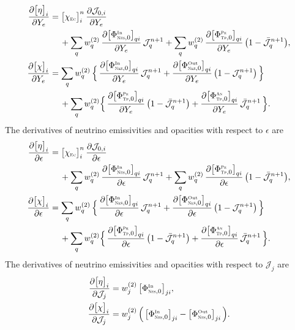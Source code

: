 \documentclass[12pt]{article}
\newcommand{\EC}{\mbox{\tiny{\sc Ec}}}
\newcommand{\NES}{\mbox{\tiny{\sc Nes}}} %
\newcommand{\PROD}{\mbox{\tiny{\sc Pr}}}
\newcommand{\ANN}{\mbox{\tiny{\sc An}}}
\newcommand{\TP}{\mbox{\tiny{\sc Tp}}}      %
\begin{document}
\begin{align}
  \pderiv{\big[\eta\big]_{i}}{Y_{e}}
  &=\big[\chi_{\EC}\big]_{i}^{n}\,\pderiv{\mathcal{J}_{0,i}}{Y_{e}} \nonumber \\
  &\hspace{12pt}
  +\sum_{q}w_{q}^{(2)}\,\pderiv{\big[\Phi_{\NES,0}^{\In}\big]_{qi}}{Y_{e}}\,\mathcal{J}_{q}^{n+1}
  +\sum_{q}w_{q}^{(2)}\,\pderiv{\big[\Phi_{\TP,0}^{\PROD}\big]_{qi}}{Y_{e}}\,\big(1-\bar{\mathcal{J}}_{q}^{n+1}\big) , \\
  \pderiv{\big[\chi\big]_{i}}{Y_{e}}
  &=\sum_{q}w_{q}^{(2)}\,\Big\{\,\pderiv{\big[\Phi_{\NES,0}^{\In}\big]_{qi}}{Y_{e}}\,\mathcal{J}_{q}^{n+1}+\pderiv{\big[\Phi_{\NES,0}^{\Out}\big]_{qi}}{Y_{e}}\,\big(1-\mathcal{J}_{q}^{n+1}\big)\,\Big\} \nonumber \\
  &\hspace{12pt}
  +\sum_{q}w_{q}^{(2)}\Big\{\,\pderiv{\big[\Phi_{\TP,0}^{\PROD}\big]_{qi}}{Y_{e}}\,\big(1-\bar{\mathcal{J}}_{q}^{n+1}\big)+\pderiv{\big[\Phi_{\TP,0}^{\ANN}\big]_{qi}}{Y_{e}}\,\bar{\mathcal{J}}_{q}^{n+1}\,\Big\}.  
\end{align}
The derivatives of neutrino emissivities and opacities with respect to $\epsilon$ are
\begin{align}
  \pderiv{\big[\eta\big]_{i}}{\epsilon}
  &=\big[\chi_{\EC}\big]_{i}^{n}\,\pderiv{\mathcal{J}_{0,i}}{\epsilon} \nonumber \\
  &\hspace{12pt}
  +\sum_{q}w_{q}^{(2)}\,\pderiv{\big[\Phi_{\NES,0}^{\In}\big]_{qi}}{\epsilon}\,\mathcal{J}_{q}^{n+1}
  +\sum_{q}w_{q}^{(2)}\,\pderiv{\big[\Phi_{\TP,0}^{\PROD}\big]_{qi}}{\epsilon}\,\big(1-\bar{\mathcal{J}}_{q}^{n+1}\big) , \\
  \pderiv{\big[\chi\big]_{i}}{\epsilon}
  &=\sum_{q}w_{q}^{(2)}\,\Big\{\,\pderiv{\big[\Phi_{\NES,0}^{\In}\big]_{qi}}{\epsilon}\,\mathcal{J}_{q}^{n+1}+\pderiv{\big[\Phi_{\NES,0}^{\Out}\big]_{qi}}{\epsilon}\,\big(1-\mathcal{J}_{q}^{n+1}\big)\,\Big\} \nonumber \\
  &\hspace{12pt}
  +\sum_{q}w_{q}^{(2)}\Big\{\,\pderiv{\big[\Phi_{\TP,0}^{\PROD}\big]_{qi}}{\epsilon}\,\big(1-\bar{\mathcal{J}}_{q}^{n+1}\big)+\pderiv{\big[\Phi_{\TP,0}^{\ANN}\big]_{qi}}{\epsilon}\,\bar{\mathcal{J}}_{q}^{n+1}\,\Big\}.  
\end{align}
The derivatives of neutrino emissivities and opacities with respect to $\mathcal{J}_{j}$ are
\begin{align}
  \pderiv{\big[\eta\big]_{i}}{\mathcal{J}_{j}}
  &=w^{(2)}_{j}\,\big[\Phi_{\NES,0}^{\In}\big]_{ji}, \\
  \pderiv{\big[\chi\big]_{i}}{\mathcal{J}_{j}}
  &=w^{(2)}_{j}\,\Big(\,\big[\Phi_{\NES,0}^{\In}\big]_{ji}-\big[\Phi_{\NES,0}^{\Out}\big]_{ji}\,\Big).  
\end{align}
\end{document}
